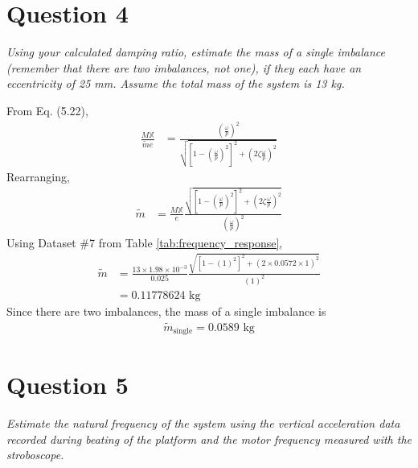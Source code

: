 \section{Question 4}
\textit{Using your calculated damping ratio, estimate the mass of a single imbalance (remember that there are two imbalances, not one), if they each have an eccentricity of 25 mm. Assume the total mass of the system is 13 kg.}

From Eq. (5.22),
\begin{align*}
    \frac{M \mathbb{X}}{\tilde{m}e} &= \frac{\left(\frac{\omega}{p}\right)^2}{\sqrt{\left[1 - \left(\frac{\omega}{p}\right)^2\right]^2 + \left(2\zeta\frac{\omega}{p}\right)^2}} 
\end{align*}
Rearranging,
\begin{align*}
    \tilde{m} &= \frac{M \mathbb{X}}{e} \frac{\sqrt{\left[1 - \left(\frac{\omega}{p}\right)^2\right]^2 + \left(2\zeta\frac{\omega}{p}\right)^2}}{\left(\frac{\omega}{p}\right)^2} 
\end{align*}
Using Dataset \#7 from Table \ref{tab:frequency_response}, 
\begin{align*}
    \tilde{m} &= \frac{13 \times 1.98 \times 10^{-3}}{0.025} \frac{\sqrt{\left[1 - \left(1\right)^2\right]^2 + \left(2 \times 0.0572 \times 1\right)^2}}{\left(1\right)^2} \\
    &= 0.11778624 \text{ kg}
\end{align*}
Since there are two imbalances, the mass of a single imbalance is 
\begin{align*}
    \boxed{\tilde{m}_{\text{single}} = 0.0589 \text{ kg}}
\end{align*}

\section{Question 5}
\textit{Estimate the natural frequency of the system using the vertical acceleration data recorded during beating of the platform and the motor frequency measured with the stroboscope.}


